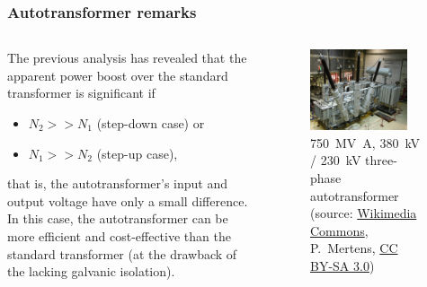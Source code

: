 \begin{frame}
	\frametitle{Autotransformer remarks}
	\begin{columns}
		\begin{column}{0.5\textwidth}
			The previous analysis has revealed that the apparent power boost over the standard transformer is significant if
            \begin{itemize}
                \item $N_2 >> N_1$ (step-down case) or
                \item $N_1 >> N_2$ (step-up case),
            \end{itemize}
		that is, the autotransformer's input and output voltage have only a small difference. \pause In this case, the autotransformer can be more efficient and cost-effective than the standard transformer (at the drawback of the lacking galvanic isolation).
		\end{column}
        \hfill
		\begin{column}{0.5\textwidth}
			\onslide<1->
			\begin{figure}
				\centering
				\includegraphics[width=0.85\textwidth]{fig/lec04/Autotransformer_three_phase.jpg}
				\caption{\SI{750}{\mega\volt\ampere}, \SI{380}{\kilo\volt} / \SI{230}{\kilo\volt} three-phase autotransformer (source: \href{https://commons.wikimedia.org/wiki/File:CG_Autotrafo_4002904.jpg}{Wikimedia Commons}, P.~Mertens, \href{https://creativecommons.org/licenses/by-sa/3.0/deed.en}{CC BY-SA 3.0})}
			\end{figure}
		\end{column}
	\end{columns}
\end{frame}


